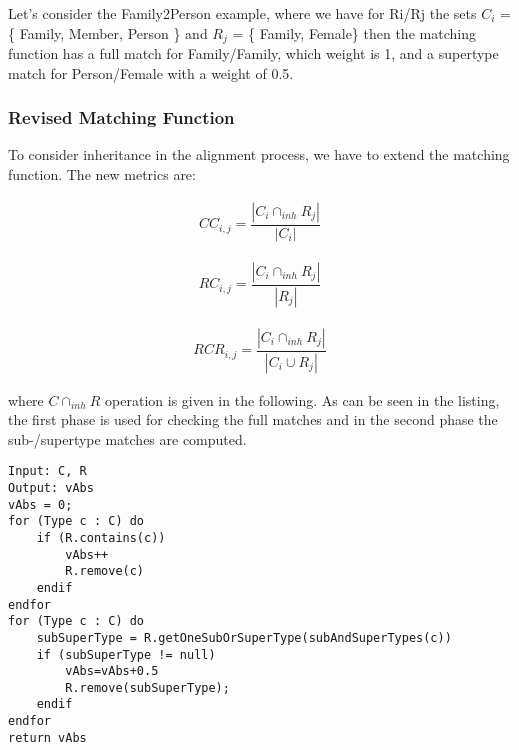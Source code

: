 Let's consider the Family2Person example, where we have for Ri/Rj  the sets $C_{i}$ = \{ Family, Member, Person \} and $R_{j}$ = \{ Family, Female\} then the matching function has a full match for Family/Family, which weight is 1, and a supertype match for Person/Female with a weight of 0.5.

\subsubsection{Revised Matching Function}

To consider inheritance in the alignment process, we have to extend the matching function.
The new metrics are:

\begin{align}
CC_{i,j} = \dfrac{| C_{i} \cap_{inh} R_{j} |}{| C_{i} |}
\label{for:firstmetric}
\end{align}

\begin{align}
RC_{i,j} = \dfrac{| C_{i} \cap_{inh} R_{j} |}{| R_{j} |}
\label{for:secondmetric}
\end{align}

\begin{align}
RCR_{i,j} = \dfrac{| C_{i} \cap_{inh} R_{j} |}{| C_{i} \cup R_{j} |}
\label{for:thirdmetric}
\end{align}

where $ C \cap_{inh} R $ operation is given in the following. As can be seen in the listing, the first phase is used for checking the full matches and in the second phase the sub-/supertype matches are computed.

\begin{lstlisting}
Input: C, R
Output: vAbs
vAbs = 0;
for (Type c : C) do
    if (R.contains(c))
        vAbs++
        R.remove(c)
    endif
endfor
for (Type c : C) do
    subSuperType = R.getOneSubOrSuperType(subAndSuperTypes(c))
    if (subSuperType != null)
        vAbs=vAbs+0.5
        R.remove(subSuperType);
    endif
endfor
return vAbs
\end{lstlisting}

